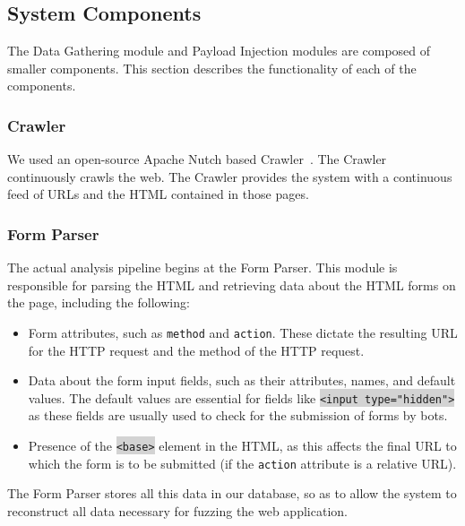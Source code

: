 \subsection{System Components}
\label{Comp}

The Data Gathering module and Payload Injection modules are composed of smaller components. This section describes the functionality of each of the components.

\subsubsection{Crawler}
\label{Comp:Crawler}
We used an open-source Apache Nutch based Crawler~\cite{nutch}. The Crawler continuously crawls the web. The Crawler provides the system with a continuous feed of URLs and the HTML contained in those pages. 

\subsubsection{Form Parser}
\label{Comp:FP}
The actual analysis pipeline begins at the Form Parser. This module is responsible for parsing the HTML and retrieving data about the HTML forms on the page, including the following:
\begin{itemize}
	\item Form attributes, such as \texttt{method} and \texttt{action}. These dictate the resulting URL for the HTTP request and the method of the HTTP request.
	\item Data about the form input fields, such as their attributes, names, and default values. The default values are essential for fields like \colorbox{lightgray}{\lstinline{<input type="hidden">}} as these fields are usually used to check for the submission of forms by bots.
	\item Presence of the \colorbox{lightgray}{\lstinline{<base>}} element in the HTML, as this affects the final URL to which the form is to be submitted (if the \texttt{action} attribute is a relative URL).
\end{itemize} 
The Form Parser stores all this data in our database, so as to allow the system to reconstruct all data necessary for fuzzing the web application.

